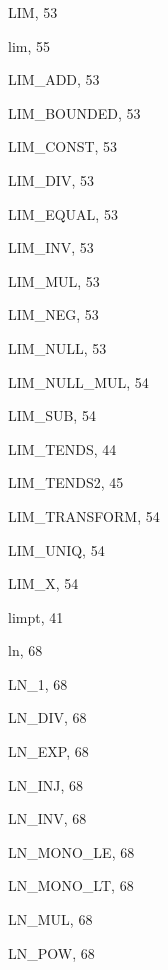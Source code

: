 \begin{theindex}
  \item {\ptt LIM}, 53
  \item {\ptt lim}, 55
  \item {\ptt LIM\_ADD}, 53
  \item {\ptt LIM\_BOUNDED}, 53
  \item {\ptt LIM\_CONST}, 53
  \item {\ptt LIM\_DIV}, 53
  \item {\ptt LIM\_EQUAL}, 53
  \item {\ptt LIM\_INV}, 53
  \item {\ptt LIM\_MUL}, 53
  \item {\ptt LIM\_NEG}, 53
  \item {\ptt LIM\_NULL}, 53
  \item {\ptt LIM\_NULL\_MUL}, 54
  \item {\ptt LIM\_SUB}, 54
  \item {\ptt LIM\_TENDS}, 44
  \item {\ptt LIM\_TENDS2}, 45
  \item {\ptt LIM\_TRANSFORM}, 54
  \item {\ptt LIM\_UNIQ}, 54
  \item {\ptt LIM\_X}, 54
  \item {\ptt limpt}, 41
  \item {\ptt ln}, 68
  \item {\ptt LN\_1}, 68
  \item {\ptt LN\_DIV}, 68
  \item {\ptt LN\_EXP}, 68
  \item {\ptt LN\_INJ}, 68
  \item {\ptt LN\_INV}, 68
  \item {\ptt LN\_MONO\_LE}, 68
  \item {\ptt LN\_MONO\_LT}, 68
  \item {\ptt LN\_MUL}, 68
  \item {\ptt LN\_POW}, 68

  \indexspace


\end{theindex}

